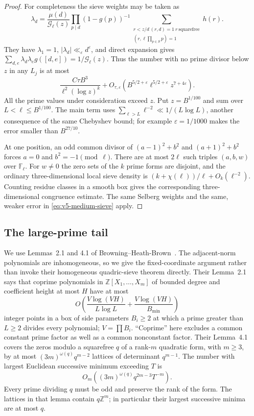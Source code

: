 \begin{proof}
For completeness the sieve weights may be taken as
\[
 \lambda_d=\frac{\mu(d)}{\mathcal G_\ell(z)}
 \prod_{p\mid d}(1-g(p))^{-1}
 \sum_{\substack{r<z/d\ (r,d)=1\ r\ \text{squarefree}\\
                      (r,\ell\prod_{p\in S}p)=1}}h(r).
\]
They have $\lambda_1=1$, $|\lambda_d|\ll_\varepsilon d^\varepsilon$,
and direct expansion gives
$\sum_{d,e}\lambda_d\lambda_e g([d,e])=1/\mathcal G_\ell(z)$.
Thus the number with no prime divisor below $z$ in any $L_j$ is at most
\[
 \frac{C\tau B^3}{\ell^2(\log z)^k}
 +O_{\tau,\varepsilon}
  (B^{5/2+\varepsilon}\ell^{5/2+\varepsilon}z^{7+4\varepsilon}).
\]
All the prime values under consideration exceed $z$. Put $z=B^{1/100}$
and sum over $L<\ell\leq B^{1/100}$. The main term uses
$\sum_{\ell>L}\ell^{-2}\ll1/(L\log L)$, another consequence of the
same Chebyshev bound; for example
$\varepsilon=1/1000$ makes the error smaller than $B^{27/10}$.

At one position, an odd common divisor of $(a-1)^2+b^2$ and
$(a+1)^2+b^2$ forces $a=0$ and $b^2=-1\pmod\ell$.
There are at most $2\ell$ such triples $(a,b,w)$ over $\mathbb F_\ell$.
For $w\ne0$ the zero sets of the $k$ prime forms are disjoint, and the
ordinary three-dimensional local sieve density is
$(k+\chi(\ell))/\ell+O_k(\ell^{-2})$.
Counting residue classes in a smooth box gives the corresponding
three-dimensional congruence estimate. The same Selberg weights and the
same, weaker error in \eqref{eq:v5-medium-sieve} apply.
\end{proof}

\subsection{The large-prime tail}\label{subsec:v5-large-sieve}

We use Lemmas~2.1 and 4.1 of Browning--Heath-Brown~\cite{v5bhb}.
The adjacent-norm polynomials are inhomogeneous, so we give the
fixed-coordinate argument rather than invoke their homogeneous
quadric-sieve theorem directly.
Their Lemma~2.1 says that coprime polynomials in $\mathbb Z[X_1,\ldots,X_m]$
of bounded degree and coefficient height at most $H$ have at most
\begin{equation}\label{eq:v5-box-sieve}
 O\left(\frac{V\log(VH)}{L\log L}
           +\frac{V\log(VH)}{B_{\min}}\right)
\end{equation}
integer points in a box of side parameters $B_i\geq2$ at which a prime
greater than $L\geq2$ divides every polynomial; $V=\prod B_i$.
``Coprime'' here excludes a common constant prime factor as well as a
common nonconstant factor. Their Lemma~4.1 covers the zeros modulo a
squarefree $q$ of a rank-$m$ quadratic form, with $m\geq3$, by at most
$(3m)^{\omega(q)}q^{m-2}$ lattices of determinant $q^{m-1}$.
The number with largest Euclidean successive minimum exceeding $T$ is
\begin{equation}\label{eq:v5-lattice-tail}
 O_m((3m)^{\omega(q)}q^{2m-3}T^{-m}).
\end{equation}
Every prime dividing $q$ must be odd and preserve the rank of the form.
The lattices in that lemma contain $q\mathbb Z^m$; in particular their
largest successive minima are at most $q$.

